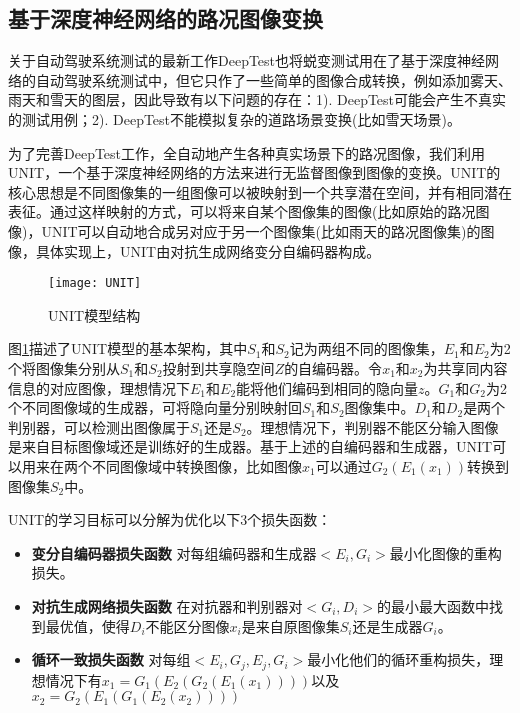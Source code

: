 \subsection{基于深度神经网络的路况图像变换}

关于自动驾驶系统测试的最新工作DeepTest\cite{DeepTest}也将蜕变测试用在了基于深度神经网络的自动驾驶系统测试中，但它只作了一些简单的图像合成转换，例如添加雾天、雨天和雪天的图层，因此导致有以下问题的存在：1). DeepTest可能会产生不真实的测试用例；2). DeepTest不能模拟复杂的道路场景变换(比如雪天场景)。

为了完善DeepTest工作，全自动地产生各种真实场景下的路况图像，我们利用UNIT\cite{UNIT}，一个基于深度神经网络的方法来进行无监督图像到图像的变换。UNIT的核心思想是不同图像集的一组图像可以被映射到一个共享潜在空间，并有相同潜在表征。通过这样映射的方式，可以将来自某个图像集的图像(比如原始的路况图像)，UNIT可以自动地合成另对应于另一个图像集(比如雨天的路况图像集)的图像，具体实现上，UNIT由对抗生成网络变分自编码器构成。

\begin{figure}[h]
    \centering
    \texttt{[image: UNIT]}
    \caption{UNIT模型结构}
    \label{unit-struct}
\end{figure}

图\ref{unit-struct}描述了UNIT模型的基本架构，其中$S_1$和$S_2$记为两组不同的图像集，$E_1$和$E_2$为2个将图像集分别从$S_1$和$S_2$投射到共享隐空间$Z$的自编码器。令$x_1$和$x_2$为共享同内容信息的对应图像，理想情况下$E_1$和$E_2$能将他们编码到相同的隐向量$z$。$G_1$和$G_2$为2个不同图像域的生成器，可将隐向量分别映射回$S_1$和$S_2$图像集中。$D_1$和$D_2$是两个判别器，可以检测出图像属于$S_1$还是$S_2$。理想情况下，判别器不能区分输入图像是来自目标图像域还是训练好的生成器。基于上述的自编码器和生成器，UNIT可以用来在两个不同图像域中转换图像，比如图像$x_1$可以通过$G_2(E_1(x_1))$转换到图像集$S_2$中。

UNIT的学习目标可以分解为优化以下3个损失函数：
\begin{itemize}
    \item \textbf{变分自编码器损失函数} 对每组编码器和生成器$<E_i,G_i>$最小化图像的重构损失。
    \item \textbf{对抗生成网络损失函数} 在对抗器和判别器对$<G_i,D_i>$的最小最大函数中找到最优值，使得$D_i$不能区分图像$x_i$是来自原图像集$S_i$还是生成器$G_i$。
    \item \textbf{循环一致损失函数} 对每组$<E_i,G_j,E_j,G_i>$最小化他们的循环重构损失，理想情况下有$x_1=G_1(E_2(G_2(E_1(x_1))))$以及$x_2=G_2(E_1(G_1(E_2(x_2))))$
\end{itemize}

